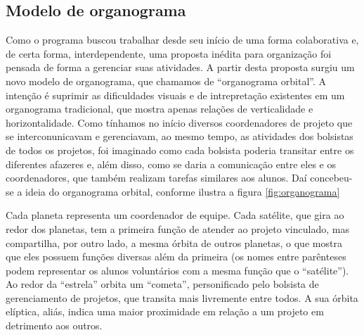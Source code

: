 \documentclass[
	12pt,				%
	openright,			%
	oneside,			%
	a4paper,			%
	english,			%
	spanish,			%
	brazil,				%
	]{abntex2}
\begin{document}
\begin{apendicesenv}

\partapendices

\chapter{Modelo de organograma} \label{ape:organograma}
Como o programa buscou trabalhar desde seu início de uma forma colaborativa e, de certa forma, interdependente, uma proposta inédita para organização foi pensada de forma a gerenciar suas atividades. A partir desta proposta surgiu um novo modelo de organograma, que chamamos de ``organograma orbital''. A intenção é suprimir as dificuldades visuais e de intrepretação existentes em um organograma tradicional, que mostra apenas relações de verticalidade e horizontalidade. Como tínhamos no início diversos coordenadores de projeto que se interconunicavam e gerenciavam, ao mesmo tempo, as atividades dos bolsistas de todos os projetos, foi imaginado como cada bolsista poderia transitar entre os diferentes afazeres e, além disso, como se daria a comunicação entre eles e os coordenadores, que também realizam tarefas similares aos alunos. Daí concebeu-se a ideia do organograma orbital, conforme ilustra a figura \ref{fig:organograma} 

Cada planeta representa um coordenador de equipe. Cada satélite, que gira ao redor dos planetas, tem a primeira função de atender ao projeto vinculado, mas compartilha, por outro lado, a  mesma órbita de outros planetas, o que mostra que eles possuem funções diversas além da primeira (os nomes entre parênteses podem representar os alunos voluntários com a mesma função que o ``satélite''). Ao redor da ``estrela'' orbita um ``cometa'', personificado pelo bolsista de gerenciamento de projetos, que transita mais livremente entre todos. A sua órbita elíptica, aliás, indica uma maior proximidade em relação a um projeto em detrimento aos outros.


\end{apendicesenv}
\end{document}
